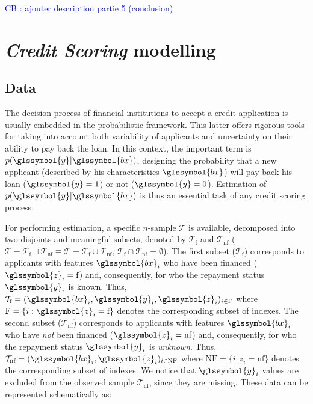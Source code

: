 \textcolor{blue}{CB : ajouter description partie 5 (conclusion)}

\section{\textit{Credit Scoring} modelling} \label{sec:criteres}

\subsection{Data} 

The decision process of financial institutions to accept a credit application is usually embedded in the  probabilistic framework. This latter offers rigorous tools for taking into account both variability of applicants and uncertainty on their ability to pay back the loan. In this context, the important term is $p(\glssymbol{y}|\glssymbol{bx})$, designing the probability that a new applicant (described by his characteristics $\glssymbol{bx}$) will pay back his loan ($\glssymbol{y}=1$) or not ($\glssymbol{y}=0$). Estimation of $p(\glssymbol{y}|\glssymbol{bx})$ is thus an essential task of any credit scoring process.

For performing estimation, a specific $n$-sample $\mathcal{T}$ is available, decomposed into two disjoints and meaningful subsets, denoted by $\mathcal{T}_{\text{f}}$ and $\mathcal{T}_{\text{nf}}$ ($\mathcal{T}=\mathcal{T}_{\text{f}} \sqcup \mathcal{T}_{\text{nf}} \equiv \mathcal{T}=\mathcal{T}_{\text{f}} \cup \mathcal{T}_{\text{nf}}$, $\mathcal{T}_{\text{f}}\cap \mathcal{T}_{\text{nf}}=\emptyset$). The first subset ($\mathcal{T}_{\text{f}}$) corresponds to applicants with features $\glssymbol{bx}_i$ who have been financed ($\glssymbol{z}_i={\text{f}}$) and, consequently, for who the repayment status $\glssymbol{y}_i$ is known. Thus, $\mathcal{T}_{\text{f}}=(\glssymbol{bx}_i,\glssymbol{y}_i,\glssymbol{z}_i)_{i\in \text{F}}$ where $\text{F}=\{i:\glssymbol{z}_i={\text{f}}\}$ denotes the corresponding subset of indexes. The second subset ($\mathcal{T}_{\text{nf}}$) corresponds to applicants with features $\glssymbol{bx}_i$ who have {\it not} been financed ($\glssymbol{z}_i={\text{nf}}$) and, consequently, for who the repayment status $\glssymbol{y}_i$ is {\it unknown}. Thus, $\mathcal{T}_{\text{nf}}=(\glssymbol{bx}_i,\glssymbol{z}_i)_{i\in \text{NF}}$ where $\text{NF}=\{i:z_i={\text{nf}}\}$ denotes the corresponding subset of indexes. We notice that $\glssymbol{y}_i$ values are excluded from the observed sample $\mathcal{T}_{\text{nf}}$, since they are missing. These data can be represented schematically as:

